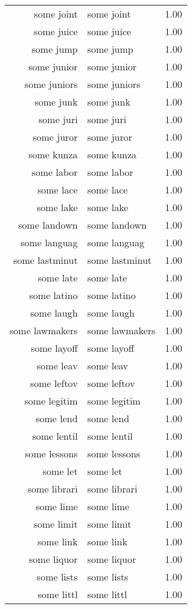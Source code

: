\begin{table}[ht]
\begin{tabular}{rlr}
  some joint & some joint & 1.00 \\ 
  some juice & some juice & 1.00 \\ 
  some jump & some jump & 1.00 \\ 
  some junior & some junior & 1.00 \\ 
  some juniors & some juniors & 1.00 \\ 
  some junk & some junk & 1.00 \\ 
  some juri & some juri & 1.00 \\ 
  some juror & some juror & 1.00 \\ 
  some kunza & some kunza & 1.00 \\ 
  some labor & some labor & 1.00 \\ 
  some lace & some lace & 1.00 \\ 
  some lake & some lake & 1.00 \\ 
  some landown & some landown & 1.00 \\ 
  some languag & some languag & 1.00 \\ 
  some lastminut & some lastminut & 1.00 \\ 
  some late & some late & 1.00 \\ 
  some latino & some latino & 1.00 \\ 
  some laugh & some laugh & 1.00 \\ 
  some lawmakers & some lawmakers & 1.00 \\ 
  some layoff & some layoff & 1.00 \\ 
  some leav & some leav & 1.00 \\ 
  some leftov & some leftov & 1.00 \\ 
  some legitim & some legitim & 1.00 \\ 
  some lend & some lend & 1.00 \\ 
  some lentil & some lentil & 1.00 \\ 
  some lessons & some lessons & 1.00 \\ 
  some let & some let & 1.00 \\ 
  some librari & some librari & 1.00 \\ 
  some lime & some lime & 1.00 \\ 
  some limit & some limit & 1.00 \\ 
  some link & some link & 1.00 \\ 
  some liquor & some liquor & 1.00 \\ 
  some lists & some lists & 1.00 \\ 
  some littl & some littl & 1.00 \\ 

\end{tabular}
\end{table}
